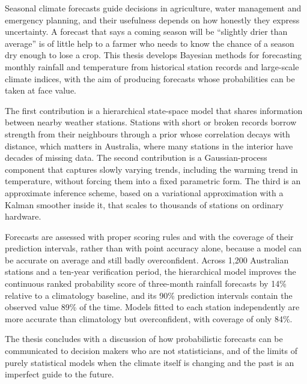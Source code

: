Seasonal climate forecasts guide decisions in agriculture, water management and emergency
planning, and their usefulness depends on how honestly they express uncertainty. A forecast that
says a coming season will be ``slightly drier than average'' is of little help to a farmer who
needs to know the chance of a season dry enough to lose a crop. This thesis develops Bayesian
methods for forecasting monthly rainfall and temperature from historical station records and
large-scale climate indices, with the aim of producing forecasts whose probabilities can be
taken at face value.

The first contribution is a hierarchical state-space model that shares information between
nearby weather stations. Stations with short or broken records borrow strength from their
neighbours through a prior whose correlation decays with distance, which matters in Australia,
where many stations in the interior have decades of missing data. The second contribution is a
Gaussian-process component that captures slowly varying trends, including the warming trend in
temperature, without forcing them into a fixed parametric form. The third is an approximate
inference scheme, based on a variational approximation with a Kalman smoother inside it, that
scales to thousands of stations on ordinary hardware.

Forecasts are assessed with proper scoring rules and with the coverage of their prediction
intervals, rather than with point accuracy alone, because a model can be accurate on average
and still badly overconfident. Across 1,200 Australian stations and a ten-year verification
period, the hierarchical model improves the continuous ranked probability score of three-month
rainfall forecasts by 14\% relative to a climatology baseline, and its 90\% prediction intervals
contain the observed value 89\% of the time. Models fitted to each station independently are
more accurate than climatology but overconfident, with coverage of only 84\%.

The thesis concludes with a discussion of how probabilistic forecasts can be communicated to
decision makers who are not statisticians, and of the limits of purely statistical models when
the climate itself is changing and the past is an imperfect guide to the future.
